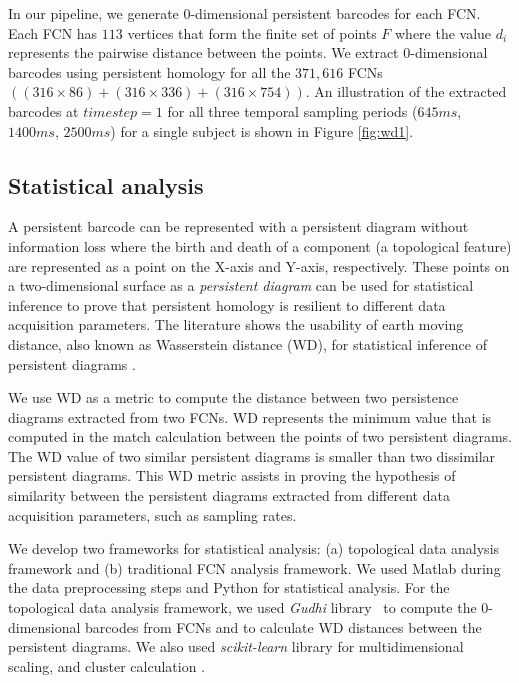 In our pipeline, we generate 0-dimensional persistent barcodes for each FCN. Each FCN has $113$ vertices that form the finite set of points $F$ where the value $d_i$ represents the pairwise distance between the points. We extract 0-dimensional barcodes using persistent homology for all the $371,616$ FCNs $((316 \times 86) + (316 \times 336) + (316 \times 754))$. An illustration of the extracted barcodes at $timestep=1$ for all three temporal sampling periods ($645ms$, $1400ms$, $2500ms$) for a single subject is shown in Figure \ref{fig:wd1}.


\subsection{Statistical analysis}
\label{sec:si}

A persistent barcode can be represented with a persistent diagram without information loss where the birth and death of a component (a topological feature) are represented as a point on the X-axis and Y-axis, respectively. These points on a two-dimensional surface as a \emph{persistent diagram} can be used for statistical inference to prove that persistent homology is resilient to different data acquisition parameters. The literature shows the usability of earth moving distance, also known as Wasserstein distance (WD), for statistical inference of persistent diagrams \cite{vallender1974calculation, edelsbrunner2013persistent}.

We use WD as a metric to compute the distance between two persistence diagrams extracted from two FCNs. WD represents the minimum value that is computed in the match calculation between the points of two persistent diagrams. The WD value of two similar persistent diagrams is smaller than two dissimilar persistent diagrams. This WD metric assists in proving the hypothesis of similarity between the persistent diagrams extracted from different data acquisition parameters, such as sampling rates. 

We develop two frameworks for statistical analysis: (a) topological data analysis framework and (b) traditional FCN analysis framework. We used Matlab during the data preprocessing steps and Python for statistical analysis. For the topological data analysis framework, we used \emph{Gudhi} library~\cite{jea_hera} to compute the 0-dimensional barcodes from FCNs and to calculate WD distances between the persistent diagrams. We also used \emph{scikit-learn} library for multidimensional scaling, and cluster calculation \cite{scikit-learn}.

